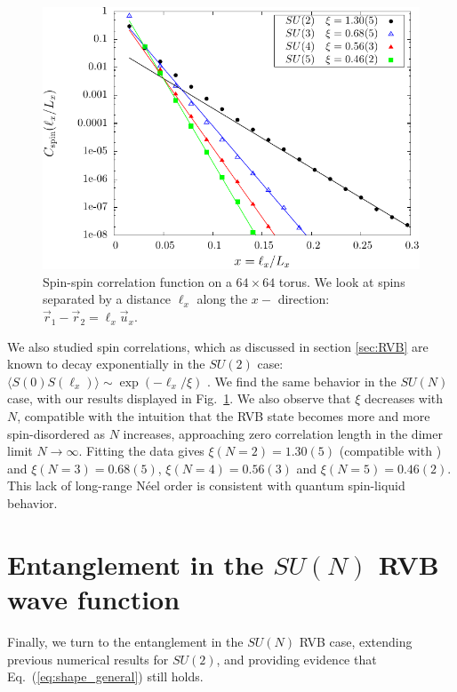 \documentclass[11pt]{iopart}
\begin{document}
\begin{figure}[ht]
 \begin{center}
  \includegraphics[scale=0.8]{./figures/spin_corr.pdf}
 \end{center}
\caption{Spin-spin correlation function on a $64\times 64$ torus. We look at spins separated by a distance $\ell_x$ along the $x-$ direction:  $\vec{r}_1-\vec{r}_2=\ell_x \vec{u}_x$. }
\label{fig:corrspin_su2}
\end{figure}
We also studied spin correlations, which as discussed in section \ref{sec:RVB} are known to decay exponentially in the $SU(2)$ case: 
$
 \langle S(0)S(\ell_x) \rangle \sim \exp \left(-{\ell_x}/{\xi}\right)
$ \cite{LDA,RVB1}.
We find the same behavior in the $SU(N)$ case, with our results displayed in Fig.~\ref{fig:corrspin_su2}. We also observe that $\xi$ decreases with $N$, compatible with the intuition that the RVB state becomes more and more spin-disordered as $N$ increases, approaching zero correlation length in the dimer limit $N\to\infty$. Fitting the data gives  $\xi(N=2)=1.30(5)$ (compatible with \cite{RVB1}) and $\xi(N=3)=0.68(5)$, $\xi(N=4)=0.56(3)$ and $\xi(N=5)=0.46(2)$. This lack of long-range N\'eel order is consistent with quantum spin-liquid  behavior. 




\section{Entanglement in the $SU(N)$ RVB wave function}
\label{sec:rvb_entanglement}

Finally, we turn to the entanglement in the $SU(N)$ RVB case, extending previous numerical results \cite{Ju2012} for $SU(2)$, and providing evidence that Eq.~(\ref{eq:shape_general}) still holds.
\end{document}
